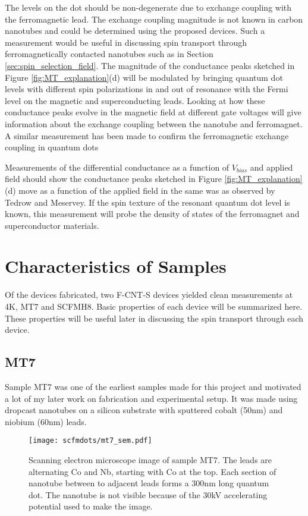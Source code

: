 The levels on the dot should be non-degenerate due to exchange coupling with the ferromagnetic lead. The exchange coupling magnitude is not known in carbon nanotubes and could be determined using the proposed devices. Such a measurement would be useful in discussing spin transport through ferromagnetically contacted nanotubes such as in Section \ref{sec:spin_selection_field}. The magnitude of the conductance peaks sketched in Figure \ref{fig:MT_explanation}(d) will be modulated by bringing quantum dot levels with different spin polarizations in and out of resonance with the Fermi level on the magnetic and superconducting leads. Looking at how these conductance peaks evolve in the magnetic field at different gate voltages will give information about the exchange coupling between the nanotube and ferromagnet. A similar measurement has been made to confirm the ferromagnetic exchange coupling in  quantum dots \cite{Hofstetter2010}

Measurements of the differential conductance as a function of $V_{bias}$ and applied field should show the conductance peaks sketched in Figure \ref{fig:MT_explanation}(d) move as a function of the applied field in the same was as observed by Tedrow and Meservey. If the spin texture of the resonant quantum dot level is known, this measurement will probe the density of states of the ferromagnet and superconductor materials.

\section{Characteristics of Samples}

Of the devices fabricated, two F-CNT-S devices yielded clean measurements at 4K, MT7 and SCFMH8. Basic properties of each device will be summarized here. These properties will be useful later in discussing the spin transport through each device.

\subsection*{MT7}

Sample MT7 was one of the earliest samples made for this project and motivated a lot of my later work on fabrication and experimental setup. It was made using dropcast nanotubes on a silicon substrate with sputtered cobalt (50nm) and niobium (60nm) leads. 

\begin{figure}
    \centering
    \texttt{[image: scfmdots/mt7\_sem.pdf]}
    \caption{Scanning electron microscope image of sample MT7. The leads are alternating Co and Nb, starting with Co at the top. Each section of nanotube between to adjacent leads forms a 300nm long quantum dot. The nanotube is not visible because of the 30kV accelerating potential used to make the image.}
    \label{fig:mt7}
\end{figure}

